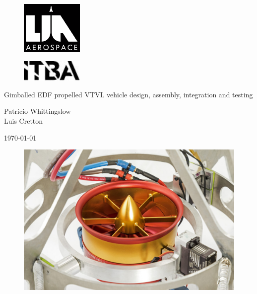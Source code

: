 \documentclass[11pt, titlepage]{article}
\author{Patricio Whittingslow \and Luis Cretton}
\begin{document}
\begin{titlepage}
	
	\centering
	\vspace{-1cm}
	\begin{figure}[htb]
		\centering
		\includegraphics[width=3cm]{fig/lia-aerospace-logo.png}
	\end{figure}
	\begin{figure}[htb]
		\centering
		\includegraphics[width=3cm]{fig/itba-logo.jpg}
	\end{figure}
	
	\vspace{1cm}
	{\Huge Gimballed EDF propelled VTVL vehicle design, assembly, integration and testing \par}
	\vspace{2cm}
	{ \large {
			Patricio Whittingslow \\ Luis Cretton 
		\par}}
	\vspace{1cm}
	\today
	\vspace{2cm}
	\begin{figure}[htb]
		\centering
		\includegraphics[width=\linewidth]{fig/hq/gimbal_close.jpg}
	\end{figure}
\end{titlepage}
\end{document}
